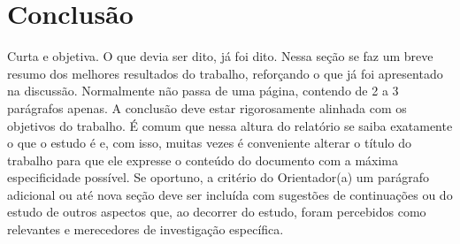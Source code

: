 \chapter{Conclusão}

Curta e objetiva. O que devia ser dito, já foi dito. Nessa seção se faz um breve resumo dos melhores resultados do trabalho, reforçando o que já foi apresentado na discussão. Normalmente não passa de uma página, contendo de 2 a 3 parágrafos apenas. A conclusão deve estar rigorosamente alinhada com os objetivos do trabalho. É comum que nessa altura do relatório se saiba exatamente o que o estudo é e, com isso, muitas vezes é conveniente alterar o título do trabalho para que ele expresse o conteúdo do documento com a máxima especificidade possível.
Se oportuno, a critério do Orientador(a) um parágrafo adicional ou até nova seção deve ser incluída com sugestões de continuações ou do estudo de outros aspectos que, ao decorrer do estudo, foram percebidos como relevantes e merecedores de investigação específica.
